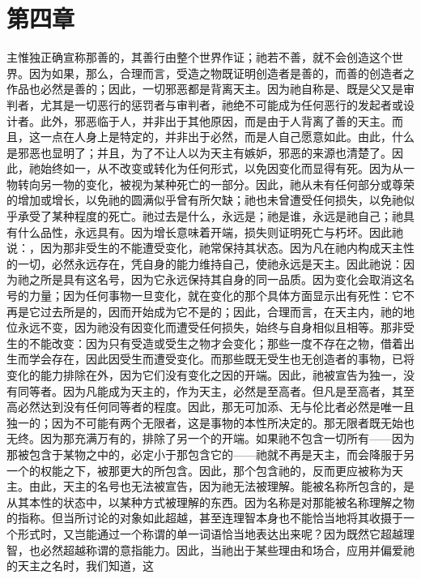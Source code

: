 
\section{第四章}

\par

主惟独正确宣称那善的，其善行由整个世界作证；祂若不善，就不会创造这个世界。因为如果，那么，合理而言，受造之物既证明创造者是善的，而善的创造者之作品也必然是善的；因此，一切邪恶都是背离天主。因为祂自称是、既是父又是审判者，尤其是一切恶行的惩罚者与审判者，祂绝不可能成为任何恶行的发起者或设计者。此外，邪恶临于人，并非出于其他原因，而是由于人背离了善的天主。而且，这一点在人身上是特定的，并非出于必然，而是人自己愿意如此。由此，什么是邪恶也显明了；并且，为了不让人以为天主有嫉妒，邪恶的来源也清楚了。因此，祂始终如一，从不改变或转化为任何形式，以免因变化而显得有死。因为从一物转向另一物的变化，被视为某种死亡的一部分。因此，祂从未有任何部分或尊荣的增加或增长，以免祂的圆满似乎曾有所欠缺；祂也未曾遭受任何损失，以免祂似乎承受了某种程度的死亡。祂过去是什么，永远是；祂是谁，永远是祂自己；祂具有什么品性，永远具有。因为增长意味着开端，损失则证明死亡与朽坏。因此祂说：，因为那非受生的不能遭受变化，祂常保持其状态。因为凡在祂内构成天主性的一切，必然永远存在，凭自身的能力维持自己，使祂永远是天主。因此祂说：因为祂之所是具有这名号，因为它永远保持其自身的同一品质。因为变化会取消这名号的力量；因为任何事物一旦变化，就在变化的那个具体方面显示出有死性：它不再是它过去所是的，因而开始成为它不是的；因此，合理而言，在天主内，祂的地位永远不变，因为祂没有因变化而遭受任何损失，始终与自身相似且相等。那非受生的不能改变：因为只有受造或受生之物才会变化；那些一度不存在之物，借着出生而学会存在，因此因受生而遭受变化。而那些既无受生也无创造者的事物，已将变化的能力排除在外，因为它们没有变化之因的开端。因此，祂被宣告为独一，没有同等者。因为凡能成为天主的，作为天主，必然是至高者。但凡是至高者，其至高必然达到没有任何同等者的程度。因此，那无可加添、无与伦比者必然是唯一且独一的；因为不可能有两个无限者，这是事物的本性所决定的。那无限者既无始也无终。因为那充满万有的，排除了另一个的开端。如果祂不包含一切所有——因为那被包含于某物之中的，必定小于那包含它的——祂就不再是天主，而会降服于另一个的权能之下，被那更大的所包含。因此，那个包含祂的，反而更应被称为天主。由此，天主的名号也无法被宣告，因为祂无法被理解。能被名称所包含的，是从其本性的状态中，以某种方式被理解的东西。因为名称是对那能被名称理解之物的指称。但当所讨论的对象如此超越，甚至连理智本身也不能恰当地将其收摄于一个形式时，又岂能通过一个称谓的单一词语恰当地表达出来呢？因为既然它超越理智，也必然超越称谓的意指能力。因此，当祂出于某些理由和场合，应用并偏爱祂的天主之名时，我们知道，这